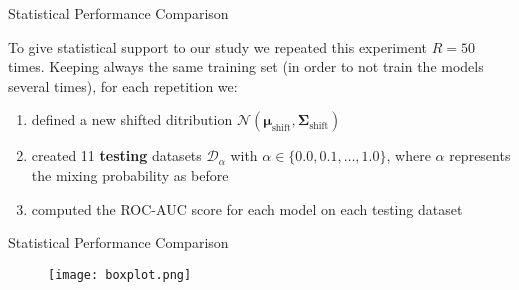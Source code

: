 \begin{frame}{Statistical Performance Comparison}

    To give statistical support to our study we repeated this experiment $R = 50$ times. Keeping always the same training set (in order to not train the models several times), for each repetition we:
    \begin{enumerate}
        \item defined a new shifted ditribution $\mathcal{N}(\boldsymbol{\mu}_{\text{shift}}, \boldsymbol{\Sigma}_{\text{shift}}) $
        \item created 11 \textbf{testing} datasets $\mathcal{D}_\alpha$ with $\alpha \in \{0.0, 0.1, \ldots, 1.0\}$, where $\alpha$ represents the mixing probability as before
        \item computed the ROC-AUC score for each model on each testing dataset
    \end{enumerate}
\end{frame}

\begin{frame}{Statistical Performance Comparison}

    \begin{figure}
        \centering
        \vfill
        \texttt{[image: boxplot.png]}
    \end{figure}

\end{frame}
